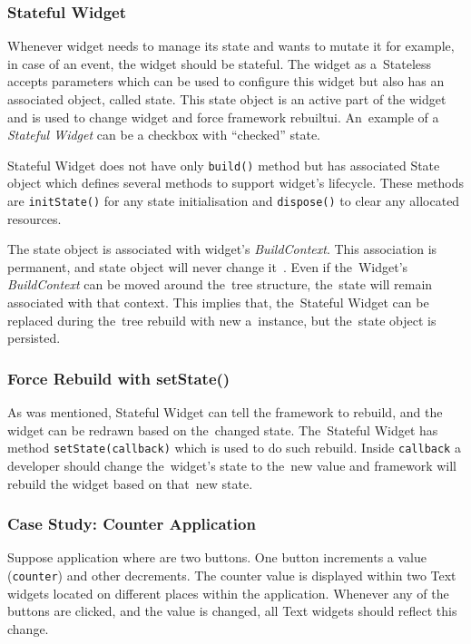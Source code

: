 \subsubsection{Stateful Widget}
Whenever widget needs to manage its state and wants to mutate it for example, in case of an event, the widget should be stateful.  The widget as a~Stateless accepts parameters which can be used to configure this widget but also has an associated object, called state. This state object is an active part of the widget and is used to change widget and force framework rebuilt\gls{ui}. An~example of a \textit{Stateful Widget} can be a checkbox with ``checked'' state. 

Stateful Widget does not have only \verb|build()| method but has associated State object which defines several methods to support widget's lifecycle. These methods are \verb|initState()| for any state initialisation and \verb|dispose()| to clear any allocated resources. 

The state object is associated with widget's \textit{BuildContext}. This association is permanent, and state object will never change it~\cite{notion-widget-didier}. Even if the~Widget's \textit{BuildContext} can be moved around the~tree structure, the~state will remain associated with that context. This implies that, the~Stateful Widget can be replaced during the~tree rebuild with new a~instance, but the~state object is persisted. 
\subsubsection{Force Rebuild with setState()}
As was mentioned, Stateful Widget can tell the framework to rebuild, and the widget can be redrawn based on the~changed state. The~Stateful Widget has method \verb|setState(callback)| which is used to do such rebuild. Inside \verb|callback| a developer should change the~widget's state to the~new value and framework will rebuild the widget based on that~new state. 
\subsubsection{Case Study: Counter Application}
Suppose application where are two buttons. One button increments a value (\verb|counter|) and other decrements. The counter value is displayed within two Text widgets located on different places within the application. Whenever any of the buttons are clicked, and the value is changed, all Text widgets should reflect this change.

